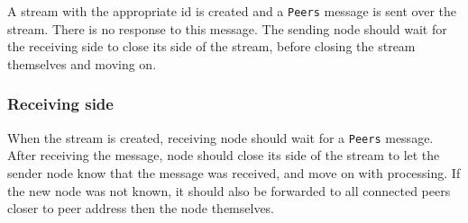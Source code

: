 A stream with the appropriate id is created and a \lstinline{Peers} message is sent over the stream. There is no response to this message. The sending node should wait for the receiving side to close its side of the stream, before closing the stream themselves and moving on.

\subsubsection{Receiving side}

When the stream is created, receiving node should wait for a \lstinline{Peers} message. After receiving the message, node should close its side of the stream to let the sender node know that the message was received, and move on with processing. If the new node was not known, it should also be forwarded to all connected peers closer to peer address then the node themselves.